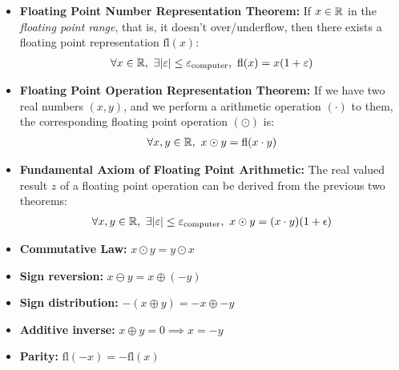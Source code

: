 \begin{tcolorbox}[colback=white, colframe=blue!10!black, title=\textbf{Floating Point Arithmetic I : Theorems} ]

\begin{itemize}
    \item \textbf{Floating Point Number Representation Theorem:}
    If $x \in \mathbb{R}$ in the \emph{floating point range},
    that is, it doesn't over/underflow, then there exists a floating
    point representation $\text{fl}(x)$:
    \begin{align*}
        \forall x \in \mathbb{R},\ \exists|\varepsilon| \le \varepsilon_{\text{computer}}, \ \text{fl}(x)=x(1+\varepsilon)
    \end{align*}

    \item \textbf{Floating Point Operation Representation Theorem:}
    If we have two real numbers $(x,y)$, and we perform a arithmetic
    operation $(\cdot)$ to them, the corresponding floating point
    operation $(\odot)$ is:
    \begin{align*}
        \forall x,y \in \mathbb{R},\ x\odot y =\text{fl}(x\cdot y)
    \end{align*}

    \item \textbf{Fundamental Axiom of Floating Point Arithmetic:}
    The real valued result $z$ of a floating point operation can be derived
    from the previous two theorems:
    \begin{align*}
        \forall x,y \in \mathbb{R},\ \exists|\varepsilon| \le \varepsilon_{\text{computer}}, \ x\odot y = (x\cdot y)(1+\epsilon)
    \end{align*}
    
\end{itemize}

\end{tcolorbox}

\begin{tcolorbox}[colback=white, colframe=blue!30!black, title=\textbf{Floating Point Arithmetic II : Identities} ]

\begin{itemize}
    \item \textbf{Commutative Law:} $x \odot y = y \odot x$
    \item \textbf{Sign reversion:} $x \ominus y = x \oplus (-y)$
    \item \textbf{Sign distribution:} $-(x \oplus y) = -x \oplus -y$
    \item \textbf{Additive inverse:} $x \oplus y = 0 \implies x=-y$
    \item \textbf{Parity:} $\text{fl}(-x) = -\text{fl}(x)$
\end{itemize}

\end{tcolorbox}

